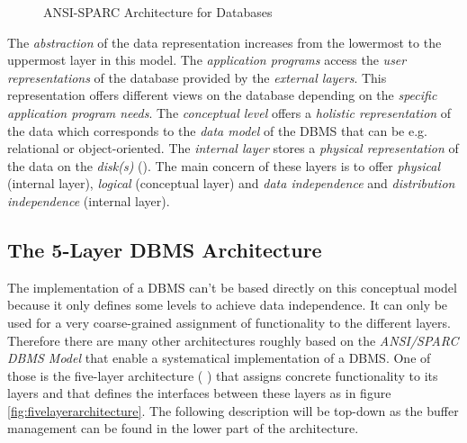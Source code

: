 \begin{@empty}
\begin{figure}[ht!]
{
		}
        \vspace{.75em}
		\caption{ANSI-SPARC Architecture for Databases}
		\label{fig:ansisparcarchitecture}
	\end{figure}
\end{@empty}

    The \emph{abstraction} of the data representation increases from the lowermost to the uppermost layer in this model. The \emph{application programs} access the \emph{user representations} of the database provided by the \emph{external layers}. This representation offers different views on the database depending on the \emph{specific application program needs}. The \emph{conceptual level} offers a \emph{holistic representation} of the data which corresponds to the \emph{data model} of the DBMS that can be e.g. relational or object-oriented. The \emph{internal layer} stores a \emph{physical representation} of the data on the \emph{disk(s)} (\cite{udemy_ANSI-SPARC}). The main concern of these layers is to offer \emph{physical} (internal layer), \emph{logical} (conceptual layer) and \emph{data independence} and \emph{distribution independence} (internal layer).

\subsection[5-Layer DBMS Architecture]{The 5-Layer DBMS Architecture}

    The implementation of a DBMS can't be based directly on this conceptual model because it only defines some levels to achieve data independence. It can only be used for a very coarse-grained assignment of functionality to the different layers. Therefore there are many other architectures roughly based on the \emph{ANSI/SPARC DBMS Model} that enable a systematical implementation of a DBMS. One of those is the five-layer architecture (\cite{Haerder:1983} \cite{Haerder:1985}) that assigns concrete functionality to its layers and that defines the interfaces between these layers as in figure \ref{fig:fivelayerarchitecture}. The following description will be top-down as the buffer management can be found in the lower part of the architecture.

